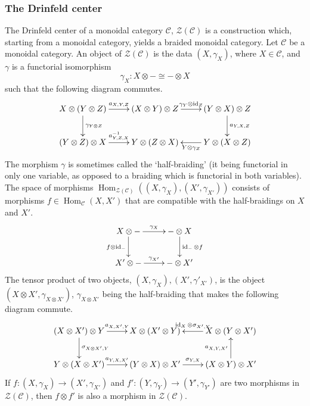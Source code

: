 \documentclass[a4paper, 10pt]{book}
\theoremstyle{definition}
\numberwithin{equation}{chapter}
\newcommand\inv{^{-1}}
\newcommand\id{\operatorname{id}}
\newcommand\ot{\otimes}
\newcommand\Hom{\operatorname{Hom}}
\newcommand\C{\mathcal C}
\newcommand\CTR{\mathcal Z}
\begin{document}
\subsubsection{The Drinfeld center}
The Drinfeld center of a monoidal category $\C$, $\CTR(\C)$ is a construction which, starting from a monoidal category, yields a braided monoidal category. Let $\C$ be a monoidal category.
An object of $\CTR(\C)$ is the data $(X, \gamma_X)$, where $X\in \C$, and $\gamma$ is a functorial isomorphism \begin{equation}
	\gamma_X: X\otimes - \cong -\otimes X
\end{equation} such that the following diagram commutes. 
 \begin{align} 
\xymatrix { X\ot (Y \ot Z) \ar[r]^{a_{X, Y, Z}}\ar[d]^{\gamma_{Y\ot Z}} & (X\ot Y) \ot Z \ar[r]^{\gamma_Y\ot \id_Z} & (Y\ot X)\ot Z \ar[d]^{a_{Y, X, Z}} \\
(Y\ot Z)\ot X \ar[r]^{a\inv_{Y, Z, X}} & Y\ot (Z \ot X) & Y\ot (X \ot Z)\ar[l]^{Y\ot \gamma_Z}\\}
\end{align}
The morphism $\gamma$ is sometimes called the `half-braiding' (it being functorial in only one variable, as opposed to a braiding which is functorial in both variables).
The space of morphisms $\Hom_{\CTR(\C)}((X, \gamma_X), (X', \gamma_{X'}))$ consists of morphisms $f\in \Hom_\C(X, X')$ that are compatible with the half-braidings on $X$ and $X'$.
\begin{equation}
 	\xymatrix{X\otimes - \ar[r]^{\gamma_X} \ar[d]_{f\otimes \id_-} & - \otimes X \ar[d]^{\id_- \otimes f} \\
 	 	X'\otimes - \ar[r]^{\gamma_{X'}} &-\otimes X' }
 \end{equation}
 The tensor product of two objects, $(X, \gamma_X), (X', \gamma'_{X'})$, is the object $(X\otimes X', \gamma_{X\ot X'})$, $\gamma_{X\ot X'}$ being the half-braiding that makes the following diagram commute. \begin{equation}\label{halfbraidingcoherence}
 	 \xymatrix{(X\otimes X') \otimes Y \ar[r]^{a_{X, X', Y}} \ar[d]^{\sigma_{X\ot X', Y}} & X\otimes (X' \otimes Y)& X\otimes (Y \otimes X') \ar[l]_{\id_X \ot \sigma_{X', Y}} \\
 	  Y\otimes (X \otimes X') \ar[r]^{a_{Y, X, X'}} &  (Y\otimes X)\otimes X'\ar[r]^{\sigma_{Y, X}} & (X \otimes Y) \otimes X' \ar[u]^{a_{X, Y, X'}}  }
 \end{equation}
If $f:(X, \gamma_X)\rightarrow (X', \gamma_{X'})$ and $f': (Y, \gamma_Y) \rightarrow (Y', \gamma_{Y'})$ are two morphisms in $\CTR(\C)$, then $f\otimes f'$ is also a morphism in $\CTR(\C)$.
\end{document}
